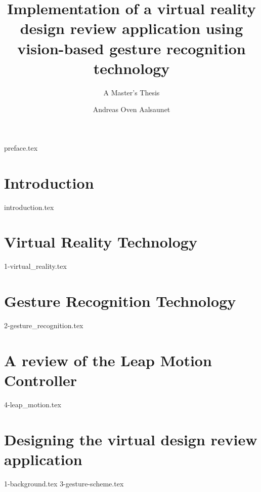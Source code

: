 \documentclass[UKenglish]{ifimaster}
\title{Implementation of a virtual reality design review application using vision-based gesture recognition technology}
\subtitle{A Master's Thesis}
\author{Andreas Oven Aalsaunet}
\begin{document}
\duoforside[dept={Department of Informatics}, program={Programming and Networks}, long]                                        

{preface.tex}

\frontmatter{}                 
\tableofcontents{}
\listoffigures{}
\listoftables{}

\mainmatter{}

\chapter{Introduction}  
{introduction.tex}

\chapter{Virtual Reality Technology}
{1-virtual_reality.tex}

\chapter{Gesture Recognition Technology}
{2-gesture_recognition.tex}

\chapter{A review of the Leap Motion Controller}
{4-leap_motion.tex}


\chapter{Designing the virtual design review application}
{1-background.tex}
{3-gesture-scheme.tex}
\end{document}

